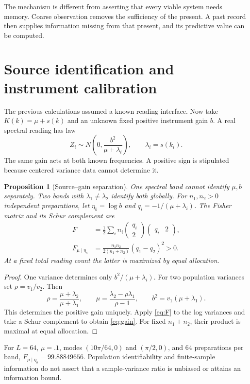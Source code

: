 \documentclass[12pt,a4paper]{article}
\newtheorem{proposition}[theorem]{Proposition}
\begin{document}
The mechanism is different from asserting that every viable system
needs memory. Coarse observation removes the sufficiency of the
present. A past record then supplies information missing from that
present, and its predictive value can be computed.

\section{Source identification and instrument calibration}

The previous calculations assumed a known reading interface. Now take
$K(k)=\mu+s(k)$ and an unknown fixed positive instrument gain $b$.
A real spectral reading has law
\[
 Z_i\sim N\!\left(0,\frac{b^2}{\mu+\lambda_i}\right),
 \qquad \lambda_i=s(k_i).
\]
The same gain acts at both known frequencies. A positive sign is
stipulated because centered variance data cannot determine it.

\begin{proposition}[Source--gain separation]\label{prop:gain}
One spectral band cannot identify $\mu,b$ separately.
Two bands with $\lambda_1\ne\lambda_2$ identify both globally.
For $n_1,n_2>0$ independent preparations, let $\eta_b=\log b$ and
$q_i=-1/(\mu+\lambda_i)$. The Fisher matrix and its Schur complement are
\begin{align}
 F&=\frac12\sum_i n_i
 \begin{pmatrix}q_i\\2\end{pmatrix}\begin{pmatrix}q_i&2\end{pmatrix},\\
 F_{\mu\mid\eta_b}
 &=\frac{n_1n_2}{2(n_1+n_2)}(q_1-q_2)^2>0.
 \label{eq:gain}
\end{align}
At a fixed total reading count the latter is maximized by equal
allocation.
\end{proposition}
\begin{proof}
One variance determines only $b^2/(\mu+\lambda_i)$.
For two population variances set $\rho=v_1/v_2$. Then
\[
 \rho=\frac{\mu+\lambda_2}{\mu+\lambda_1},\qquad
 \mu=\frac{\lambda_2-\rho\lambda_1}{\rho-1},\qquad
 b^2=v_1(\mu+\lambda_1).
\]
This determines the positive gain uniquely. Apply \eqref{eq:F} to
the log variances and take a Schur complement to obtain \eqref{eq:gain}.
For fixed $n_1+n_2$, their product is maximal at equal allocation.
\end{proof}

For $L=64$, $\mu=.1$, modes $(10\pi/64,0)$ and $(\pi/2,0)$,
and $64$ preparations per band, $F_{\mu\mid\eta_b}=99.88849656$.
Population identifiability and finite-sample information do not assert
that a sample-variance ratio is unbiased or attains an information bound.
\end{document}
